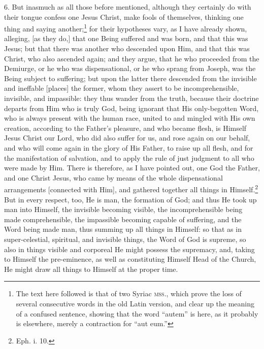 6. But inasmuch as all those before mentioned, although they certainly do with their tongue confess one Jesus Christ, make fools of themselves, thinking one thing and saying another;\footnote{The text here followed is that of two Syriac \textsc{mss.}, which prove the loss of several consecutive words in the old Latin version, and clear up the meaning of a confused sentence, showing that the word “autem” is here, as it probably is elsewhere, merely a contraction for “aut eum.”} for their hypotheses vary, as I have already shown, alleging, [as they do,] that one Being suffered and was born, and that this was Jesus; but that there was another who descended upon Him, and that this was Christ, who also ascended again; and they argue, that he who proceeded from the Demiurge, or he who was dispensational, or he who sprang from Joseph, was the Being subject to suffering; but upon the latter there descended from the invisible and ineffable [places] the former, whom they assert to be incomprehensible, invisible, and impassible: they thus wander from the truth, because their doctrine departs from Him who is truly God, being ignorant that His only-begotten Word, who is always present with the human race, united to and mingled with His own creation, according to the Father’s pleasure, and who became flesh, is Himself Jesus Christ our Lord, who did also suffer for us, and rose again on our behalf, and who will come again in the glory of His Father, to raise up all flesh, and for the manifestation of salvation, and to apply the rule of just judgment to all who were made by Him. There is therefore, as I have pointed out, one God the Father, and one Christ Jesus, who came by means of the whole dispensational arrangements [connected with Him], and gathered  together all things in Himself.\footnote{Eph. i. 10.} But in every respect, too, He is man, the formation of God; and thus He took up man into Himself, the invisible becoming visible, the incomprehensible being made comprehensible, the impassible becoming capable of suffering, and the Word being made man, thus summing up all things in Himself: so that as in super-celestial, spiritual, and invisible things, the Word of God is supreme, so also in things visible and corporeal He might possess the supremacy, and, taking to Himself the pre-eminence, as well as constituting Himself Head of the Church, He might draw all things to Himself at the proper time.

